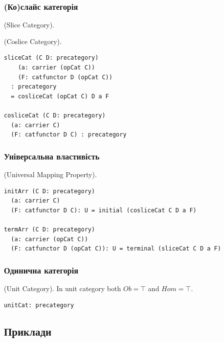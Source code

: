 \begin{definition}
\subsubsection{(Ко)слайс категорія}
\begin{definition} (Slice Category).
\end{definition}
\begin{definition} (Coslice Category).
\begin{lstlisting}
sliceCat (C D: precategory)
    (a: carrier (opCat C))
    (F: catfunctor D (opCat C))
  : precategory
  = cosliceCat (opCat C) D a F

cosliceCat (C D: precategory)
  (a: carrier C)
  (F: catfunctor D C) : precategory
\end{lstlisting}
\end{definition}

\subsubsection{Універсальна властивість}
\begin{definition} (Universal Mapping Property).
\begin{lstlisting}
initArr (C D: precategory)
  (a: carrier C)
  (F: catfunctor D C): U = initial (cosliceCat C D a F)

termArr (C D: precategory)
  (a: carrier (opCat C))
  (F: catfunctor D (opCat C)): U = terminal (sliceCat C D a F)
\end{lstlisting}
\end{definition}

\subsubsection{Одинична категорія}
\begin{definition} (Unit Category).
In unit category both $Ob = \top$ and $Hom = \top$.
\begin{lstlisting}
unitCat: precategory
\end{lstlisting}
\end{definition}

\subsection{Приклади}

\end{definition}
